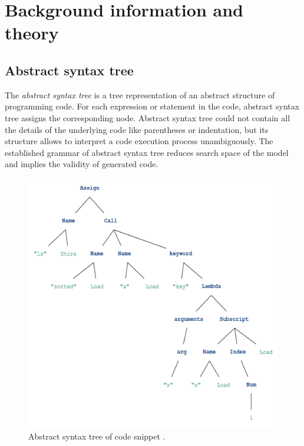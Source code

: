 \chapter{Background information and theory}
\label{Chapter3}

\section{Abstract syntax tree}
The \emph{abstract syntax tree} is a tree representation of an abstract structure of programming code. For each expression or statement in the code, abstract syntax tree assigns the corresponding node. Abstract syntax tree could not contain all the details of the underlying code like parentheses or indentation, but its structure allows to interpret a code execution process unambiguously. The established grammar of abstract syntax tree reduces search space of the model and implies the validity of generated code.

\begin{figure}[h]
\centering
\includegraphics[width=5in]{Figures/ast}
\decoRule
\caption[Abstract Syntax Tree]{Abstract syntax tree of code snippet \protect\footnotemark.}
\label{fig:ast}
\end{figure}


